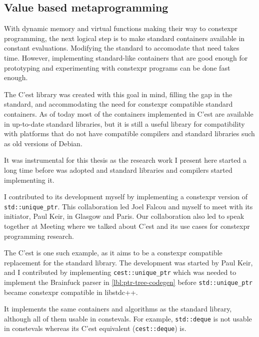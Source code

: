 \documentclass[../main]{subfiles}
\begin{document}
\subsection{
  Value based metaprogramming
}


With dynamic memory and virtual functions making their way to
\gls{constexpr} programming, the next logical step is to make standard \cpp
containers available in constant evaluations.
Modifying the \cpp standard to accomodate that need takes time.
However, implementing standard-like containers that are good enough
for prototyping and experimenting with \gls{constexpr} programs
can be done fast enough.

The C'est \cite{cest} library was created with this goal in mind, filling the
gap in the \cpp standard, and accommodating the need for \gls{constexpr}
compatible standard containers.
As of today most of the containers implemented in C'est are available in
up-to-date standard libraries, but it is still a useful library for
compatibility with platforms that do not have  compatible compilers and
standard libraries such as old versions of Debian.

It was instrumental for this thesis as the research work I present here started
a long time before  was adopted and standard libraries and compilers
started implementing it.

I contributed to its development myself by implementing a \gls{constexpr} version
of \lstinline{std::unique_ptr}. This collaboration led Joel Falcou and myself to
meet with its initiator, Paul Keir, in Glasgow and Paris.
Our collaboration also led to speak together at
Meeting  \cite{meetingcpp22} where we talked about C'est and
its use cases for \gls{constexpr} programming research.




The C'est\cite{cest} is one such example, as it aims to be a \gls{constexpr}
compatible replacement for the \cpp standard library. The development was
started by Paul Keir, and I contributed by implementing
\lstinline{cest::unique_ptr} which was needed to implement the Brainfuck parser
in \ref{lbl:ptr-tree-codegen} before \lstinline{std::unique_ptr} became
\gls{constexpr} compatible in libstdc++.

It implements the same containers and algorithms as the \cpp standard library,
although all of them usable in \glspl{consteval}. For example,
\lstinline{std::deque} is not usable in \glspl{consteval} whereas
its C'est equivalent (\lstinline{cest::deque}) is.
\end{document}
